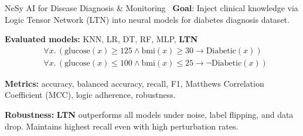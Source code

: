 \documentclass[presentation]{beamer}\mode<presentation>{\usetheme{AMSBolognaFC}}
\begin{document}
\begin{frame}[c]{NeSy AI for Disease Diagnosis \& Monitoring~}
    \footnotesize
    \textbf{Goal}: Inject clinical knowledge via Logic Tensor Network (LTN) into neural models for diabetes diagnosis dataset.

    \textbf{Evaluated models:} KNN, LR, DT, RF, MLP, \textbf{LTN}
    \begin{align*}
        &\forall x.\, (\text{glucose}(x) \geq 125 \land \text{bmi}(x) \geq 30 \rightarrow \text{Diabetic}(x)) \\
        &\forall x.\, (\text{glucose}(x) \leq 100 \land \text{bmi}(x) \leq 25 \rightarrow \neg \text{Diabetic}(x))
    \end{align*}

    \vspace{-1mm}
    \textbf{Metrics:} accuracy, balanced accuracy, recall, F1, Matthews Correlation Coefficient (MCC), logic adherence, robustness.

    

    \textbf{Robustness:} \textbf{LTN} outperforms all models under noise, label flipping, and data drop.
    Maintains highest recall even with high perturbation rates.

\end{frame}
\end{document}

